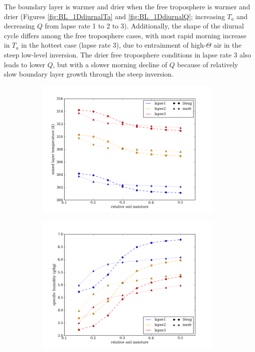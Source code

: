 
The boundary layer is warmer and drier when the free troposphere is warmer and drier (Figures \ref{fig:BL_1DdiurnalTa} and \ref{fig:BL_1DdiurnalQ}; increasing $T_a$ and decreasing $Q$ from lapse rate 1 to 2 to 3).  Additionally, the shape of the diurnal cycle differs among the free troposphere cases, with most rapid morning increase in $T_a$ in the hottest case (lapse rate 3), due to entrainment of high-$\Theta$ air in the steep low-level inversion.  The drier free troposphere conditions in lapse rate 3 also leads to lower $Q$, but with a slower morning decline of $Q$ because of relatively slow boundary layer growth through the steep inversion.

\begin{figure}[here]
\begin{subfigure}{0.5\textwidth}
\includegraphics[width=\textwidth]{ch2-BL/figures/all_afternoon_T.png}
\caption{}
\end{subfigure}
\begin{subfigure}{0.5\textwidth}
\includegraphics[width=\textwidth]{ch2-BL/figures/all_afternoon_Q.png}
\caption{}
\end{subfigure}
\caption{}
\label{fig:BL_345changes}
\end{figure}

